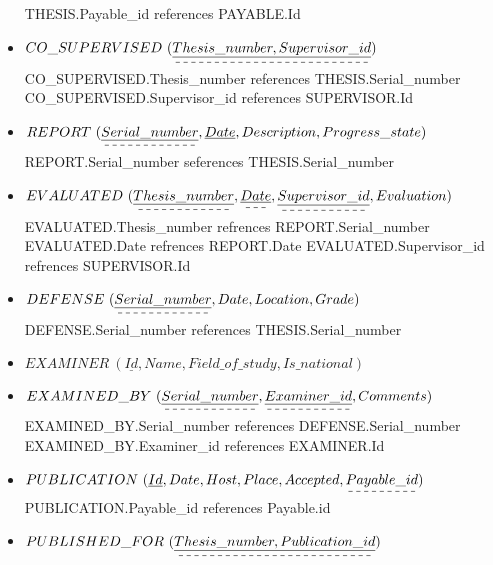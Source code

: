 \documentclass[a4paper]{article}
\begin{document}
\begin{itemize}
    \newline THESIS.Payable\_id references PAYABLE.Id
    \newline
\item$CO\_SUPERVISED \ (\dashuline{\underline{Thesis\_number,Supervisor\_id}})$
    \newline CO\_SUPERVISED.Thesis\_number references THESIS.Serial\_number
    \newline CO\_SUPERVISED.Supervisor\_id references SUPERVISOR.Id 
\newline        
\item$ REPORT \ (\dashuline{\underline{Serial\_number}}, \underline{Date}, Description, Progress\_state)$
    \newline REPORT.Serial\_number seferences THESIS.Serial\_number
\newline    
\item$EVALUATED \ (\dashuline{\underline{Thesis\_number}}, \dashuline{\underline{Date}}, \dashuline{\underline{Supervisor\_id}}, Evaluation)$
    \newline EVALUATED.Thesis\_number refrences  REPORT.Serial\_number
    \newline EVALUATED.Date refrences REPORT.Date
    \newline EVALUATED.Supervisor\_id refrences SUPERVISOR.Id 
\newline    
\item$DEFENSE \ (\dashuline{\underline{Serial\_number}}, Date , Location , Grade )$
    \newline DEFENSE.Serial\_number references THESIS.Serial\_number
   \newline
\item$EXAMINER \ (\underline{Id}, Name , Field\_of\_study , Is\_national)$
\newline
\item$ EXAMINED\_BY \ (\dashuline{\underline{Serial\_number}}, \dashuline{\underline{Examiner\_id}},Comments)$
    \newline EXAMINED\_BY.Serial\_number references DEFENSE.Serial\_number
    \newline EXAMINED\_BY.Examiner\_id references EXAMINER.Id
\newline
\item$ PUBLICATION \ (\underline{Id}, Date, Host, Place, Accepted, \dashuline{Payable\_id})$
    \newline PUBLICATION.Payable\_id references Payable.id 
\newline  
\item$ PUBLISHED\_FOR\ (\dashuline{\underline{Thesis\_number,Publication\_id}})$  

\end{itemize}
\end{document}
